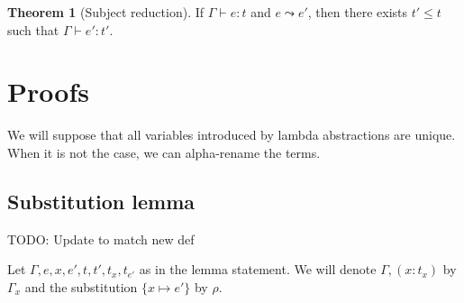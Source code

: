 \documentclass[a4paper]{article}%
\theoremstyle{definition}
\newtheorem{theorem}{Theorem}
\begin{document}
    \begin{theorem}[Subject reduction]
      If $\Gamma \vdash e : t$ and $e \leadsto e'$, then there exists $t' \leq t$ such that $\Gamma \vdash e' : t'$.
    \end{theorem}

    \section{Proofs}

    We will suppose that all variables introduced by lambda abstractions are unique. When it is not the case, we can alpha-rename the terms.

    \subsection{Substitution lemma}

    TODO: Update to match new def

    Let $\Gamma,e,x,e',t,t',t_x,t_{e'}$ as in the lemma statement.
    We will denote $\Gamma, (x:t_x)$ by $\Gamma_x$ and the substitution $\{x\mapsto e'\}$ by $\rho$.
\end{document}
